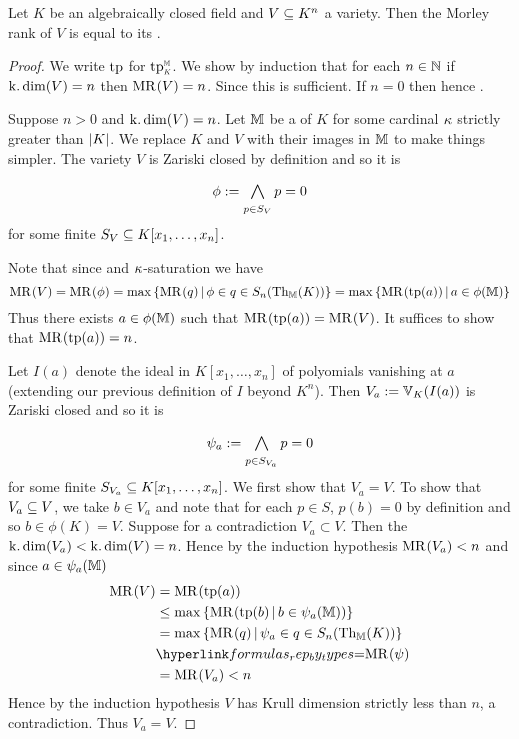 \begin{prop}
    Let $K$ be an algebraically closed field and $V \subseteq K^n$ a variety.
    Then the Morley rank of $V$ is equal to its 
    .
\end{prop}
\begin{proof}
    We write $\operatorname{tp}$ for $\subintp{K}{\M}{\tp}$.
    We show by induction that for each $n \in \mathbb{N}$
    if $\operatorname{k.dim}(V) = n$
    then $\mathrm{MR}^{}(V) = n$.
    Since  this is sufficient.
    If $n = 0$ then  
    hence .

    Suppose $n > 0$ and $\operatorname{k.dim}(V) = n$.
    Let $\mathbb{M}$ be a 
     of $K$
    for some cardinal $\kappa$ strictly greater than $\left\vert K \right\vert$.
    We replace $K$ and $V$ with their images in $\mathbb{M}$ to make things simpler.
    The variety $V$ is Zariski closed by definition and so it is 
    \[\phi := \bigand{p \in S_V}{} p = 0\]
    for some finite $S_V \subseteq K[x_1,\dots,x_n]$.
    
    Note that since 
    and $\kappa$-saturation we have
    \[
        \mathrm{MR}^{}(V) = \mathrm{MR}^{}(\phi) = 
        \max \left\{\mathrm{MR}^{}(q) \,|\, \phi \in q \in S_n(\mathrm{Th}_{\mathbb{M}}(K))\right\}
        = \max \left\{\mathrm{MR}^{}(\operatorname{tp}(a)) \,|\, a \in \phi(\mathbb{M})\right\}
    \]
    Thus there exists $a \in \phi(\mathbb{M})$ such that $\mathrm{MR}^{}(\operatorname{tp}(a)) = \mathrm{MR}^{}(V)$.
    It suffices to show that $\mathrm{MR}^{}(\operatorname{tp}(a)) = n$.

    Let $I(a)$ denote the ideal in $K[x_1,\dots,x_n]$ 
    of polyomials vanishing at $a$ 
    (extending our previous definition of $I$ beyond $K^n$).
    Then $V_a := \mathbb{V}_K(I(a))$ is Zariski closed and so it is 
    \[\psi_a := \bigand{p \in S_{V_a}}{} p = 0\]
    for some finite $S_{V_a} \subseteq K[x_1,\dots,x_n]$.
    We first show that $V_a = V$.
    To show that $V_a \subseteq V$, we take $b \in V_a$ and note that 
    for each $p \in S$, $p(b) = 0$ by definition and so  
    $b \in \phi(K) = V$.
    Suppose for a contradiction $V_a \subset V$.
    Then the $\operatorname{k.dim}(V_a) < \operatorname{k.dim}(V) = n$.
    Hence by the induction hypothesis $\mathrm{MR}^{}(V_a) < n$ 
    and since $a \in \psi_a(\mathbb{M})$
    \begin{align*}
        \MR{}{V} 
        &= \MR{}{\tp(a)} \\
        &\leq \max\set{\MR{}{\tp(b) \st b \in \psi_a(\M)}}\\
        &= \max \set{\MR{}{q} \st \psi_a \in q \in S_n(\Theory_\M(K))}\\
        &\linkto{formulas_rep_by_types}{=} \MR{}{\psi} \\
        &= \MR{}{V_a} < n
    \end{align*}
    Hence by the induction hypothesis $V$ 
    has Krull dimension strictly less than $n$, a contradiction.
    Thus $V_a = V$.


\end{proof}
